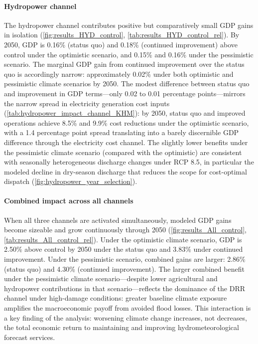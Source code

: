 \documentclass[
  final,
  10pt,
  letterpaper,
  english,
]{article}
\begin{document}
\paragraph{Hydropower channel}
The hydropower channel contributes positive but comparatively small GDP gains in
isolation (\cref{fig:results_HYD_control}, \cref{tab:results_HYD_control_rel}).
By 2050, GDP is 0.16\% (status quo) and 0.18\% (continued improvement) above
control under the optimistic scenario, and 0.15\% and 0.16\% under the
pessimistic scenario. The marginal GDP gain from continued improvement over the
status quo is accordingly narrow: approximately 0.02\% under both optimistic and
pessimistic climate scenarios by 2050. The modest difference between status quo
and improvement in GDP terms---only 0.02 to 0.01 percentage points---mirrors the
narrow spread in electricity generation cost inputs
(\cref{tab:hydropower_impact_channel_KHM}): by 2050, status quo and improved
operations achieve 8.5\% and 9.9\% cost reductions under the optimistic
scenario, with a 1.4 percentage point spread translating into a barely
discernible GDP difference through the electricity cost channel. The slightly
lower benefits under the pessimistic climate scenario (compared with the
optimistic) are consistent with seasonally heterogeneous discharge changes under
RCP 8.5, in particular the modeled decline in dry-season discharge that reduces
the scope for cost-optimal dispatch (\cref{fig:hydropower_year_selection}).



\paragraph{Combined impact across all channels}
When all three channels are activated simultaneously, modeled GDP gains become
sizeable and grow continuously through 2050
(\cref{fig:results_All_control},
\cref{tab:results_All_control_rel}). Under the optimistic climate
scenario, GDP is 2.50\% above control by 2050 under the status quo and 3.83\%
under continued improvement. Under the pessimistic scenario, combined gains are
larger: 2.86\% (status quo) and 4.30\% (continued improvement). The larger
combined benefit under the pessimistic climate scenario---despite lower
agricultural and hydropower contributions in that scenario---reflects the
dominance of the DRR channel under high-damage conditions: greater baseline
climate exposure amplifies the macroeconomic payoff from avoided flood losses.
This interaction is a key finding of the analysis: worsening climate change
increases, not decreases, the total economic return to maintaining and improving
hydrometeorological forecast services.
\end{document}
